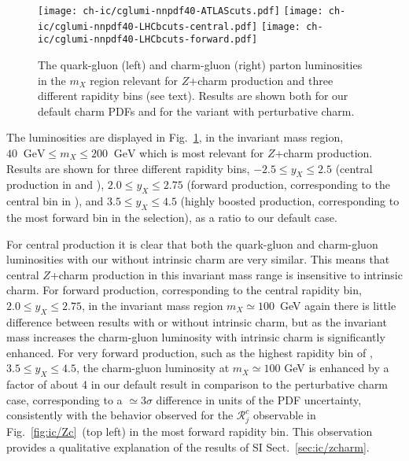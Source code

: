 \begin{figure}[htbp]
  \begin{center}
    \texttt{[image: ch-ic/cglumi-nnpdf40-ATLAScuts.pdf]}
    \texttt{[image: ch-ic/cglumi-nnpdf40-LHCbcuts-central.pdf]}
    \texttt{[image: ch-ic/cglumi-nnpdf40-LHCbcuts-forward.pdf]}
    \caption{\small The quark-gluon (left) and charm-gluon (right)
      parton luminosities in the  $m_X$ region
      relevant for $Z$+charm production and  three different
      rapidity bins (see text). Results are shown both for our default charm
    PDFs and for the variant with perturbative charm. 
  \label{fig:ic/charm_luminosities} }
\end{center}
\end{figure}

The luminosities are displayed in Fig.~\ref{fig:ic/charm_luminosities},
in the  invariant mass region,
$40~\textrm{ GeV}\le m_X \le 200~\textrm{ GeV}$ which is most relevant for
$Z$+charm production.
%
Results are shown 
for three different
rapidity bins, $-2.5 \le y_X \le 2.5$ (central production in \atlas and \cms),
$2.0 \le y_X \le 2.75$ (forward production, corresponding to the
central bin in \lhcb),
and $3.5 \le y_X \le 4.5$ (highly boosted production, corresponding to
the most forward bin in the \lhcb selection), as a ratio to our default case.

For central production it is clear that both the quark-gluon and
charm-gluon luminosities with our without intrinsic charm are very similar.
This means that central $Z$+charm production in this invariant mass
range is insensitive to intrinsic charm.
%
For forward production, corresponding to the  central \lhcb rapidity
bin, $2.0 \le y_X \le 2.75$, in the invariant mass region  $m_X\simeq
100$~GeV again there is little difference between results with or
without intrinsic charm, but as the invariant mass increases the
charm-gluon luminosity with intrinsic charm is significantly enhanced.
%
For very forward production, such as the highest rapidity bin of \lhcb,
$3.5 \le y_X \le 4.5$, the charm-gluon luminosity 
at $m_X \simeq 100$ GeV is enhanced  by a factor of about 4 in our
default result in comparison to the perturbative charm case, corresponding
to a $\simeq 3\sigma$ difference in units of the PDF uncertainty,
consistently with the behavior observed for the 
$\mathcal{R}_j^c$ observable in Fig.~\ref{fig:ic/Zc}~(top left) in the
most forward rapidity  bin.
%
This observation provides a qualitative explanation of
the results of SI Sect.~\ref{sec:ic/zcharm}.
